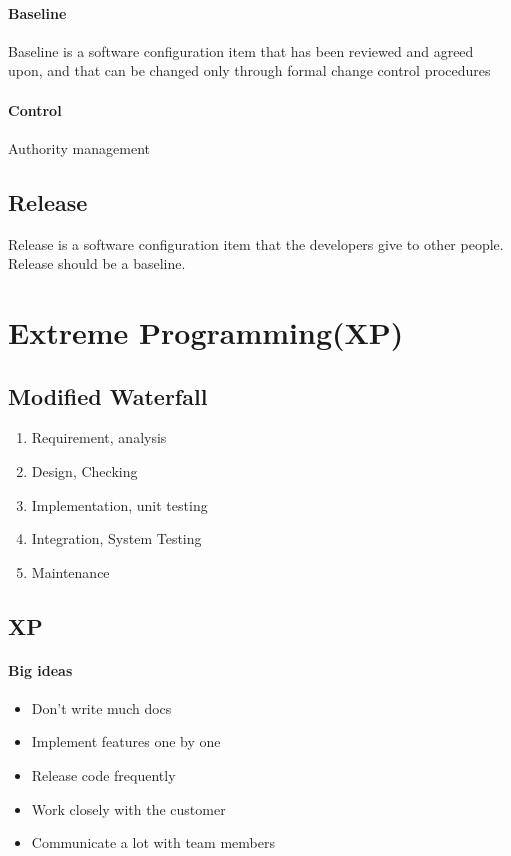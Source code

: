 \documentclass[12pt]{article}
\begin{document}
    \paragraph{Baseline}Baseline is a software configuration item that has been reviewed and agreed upon, and that can be changed only through formal change control procedures
    
    \paragraph{Control}Authority management
    
    \subsection{Release} Release is a software configuration item that the developers give to other people. Release should be a baseline.
    
    \section{Extreme Programming(XP)}
    \subsection{Modified Waterfall}
    	\begin{enumerate}
    		\item Requirement, analysis
    		\item Design, Checking
    		\item Implementation, unit testing
    		\item Integration, System Testing
    		\item Maintenance
    	\end{enumerate}
   \subsection{XP}
   		\paragraph{Big ideas}
   		\begin{itemize}
   			\item Don't write much docs
   			\item Implement features one by one
   			\item Release code frequently
   			\item Work closely with the customer
   			\item Communicate a lot with team members
   		\end{itemize}
   		
\end{document}
